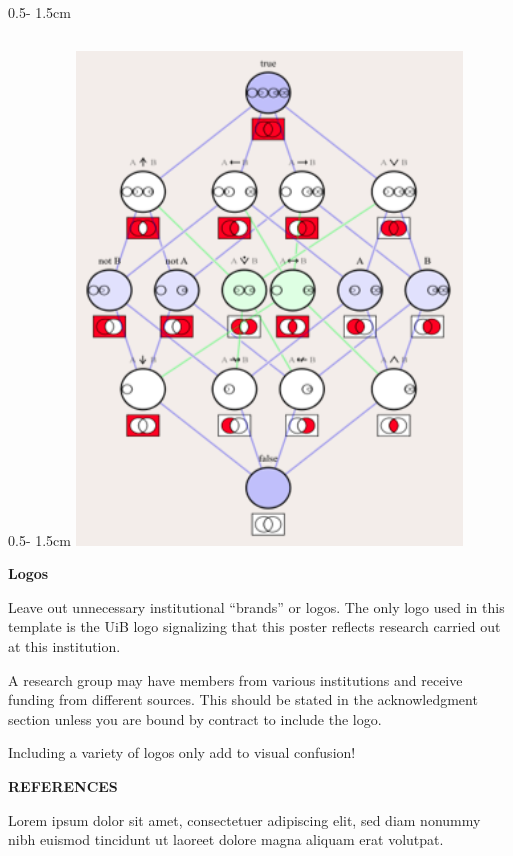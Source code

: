 \documentclass{uibposter}
\begin{document}
\begin{frame}
\begin{columns}
\begin{column}{0.5\textwidth - 1.5cm}
\begin{column}{0.5\textwidth - 1.5cm}
    \includegraphics[width = \textwidth]{uibposter-images/bilde3.png}

    \textbf{Logos}

    Leave out unnecessary institutional “brands” or logos. The only logo used in this template is the UiB logo signalizing that this poster reflects research carried out at this institution.
\vspace{0.2cm}

    A research group may have members from various institutions and receive funding from different sources. This should be stated in the acknowledgment section unless you are bound by contract to include the logo.
\vspace{0.2cm}

    Including a variety of logos only add to visual confusion!
    \vspace{5cm}

    {\scriptsize
    \textbf{REFERENCES}

    Lorem ipsum dolor sit amet, consectetuer adipiscing elit, sed diam nonummy nibh euismod tincidunt ut laoreet dolore magna aliquam erat volutpat.

}
\end{column}
\end{column}
\end{columns}
\end{frame}
\end{document}
